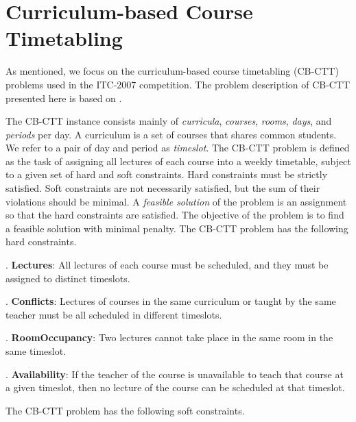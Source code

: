 \section{Curriculum-based Course Timetabling}\label{sec:cb-ctt}

As mentioned, we focus on the curriculum-based course timetabling
(CB-CTT) problems used in the ITC-2007 competition.
The problem description of CB-CTT presented here is based on 
\citep{DBLP:journals/anor/BonuttiCGS12}.

The CB-CTT instance consists mainly of
\textit{curricula},
\textit{courses},
\textit{rooms},
\textit{days}, and
\textit{periods} per day.
A curriculum is a set of courses that shares common students.
We refer to a pair of day and period as \textit{timeslot}.
%
The CB-CTT problem is defined as the task of assigning all lectures
of each course into a weekly timetable, 
subject to a given set of hard and soft constraints.
%
Hard constraints must be strictly satisfied.
Soft constraints are not necessarily satisfied,
but the sum of their violations should be minimal.
%
A \textit{feasible solution} of the problem is an assignment
so that the hard constraints are satisfied.
The objective of the problem is to find a feasible solution with minimal penalty.
%
The CB-CTT problem has the following hard constraints.
\begin{list}{}{}
\item {}. \textbf{Lectures}: 
  All lectures of each course must be scheduled, 
  and they must be assigned to distinct timeslots.
\item {}. \textbf{Conflicts}: 
  Lectures of courses in the same curriculum or taught by the same
  teacher must be all scheduled in different timeslots.
\item {}. \textbf{RoomOccupancy}: 
  Two lectures cannot take place in the same room in the same timeslot.
\item {}. \textbf{Availability}: 
  If the teacher of the course is unavailable to teach that course
  at a given timeslot, then no lecture of the course can be scheduled at
  that timeslot.
\end{list}
The CB-CTT problem has the following soft constraints.
